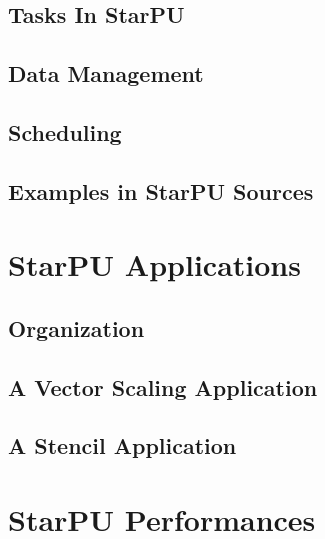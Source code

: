 \chapter{Tasks In StarPU}
\label{TasksInStarPU}
\hypertarget{TasksInStarPU}{}


\chapter{Data Management}
\label{DataManagement}
\hypertarget{DataManagement}{}


\chapter{Scheduling}
\label{Scheduling}
\hypertarget{Scheduling}{}


\chapter{Examples in StarPU Sources}
\label{ExamplesInStarPUSources}
\hypertarget{ExamplesInStarPUSources}{}


\part{StarPU Applications}
\label{StarPUApplications}

\chapter{Organization}
\label{IntroApplications}
\hypertarget{IntroApplications}{}


\chapter{A Vector Scaling Application}
\label{VectorScalingApplication}
\hypertarget{VectorApplication}{}


\chapter{A Stencil Application}
\label{StencilApplication}
\hypertarget{StencilApplication}{}


\part{StarPU Performances}

